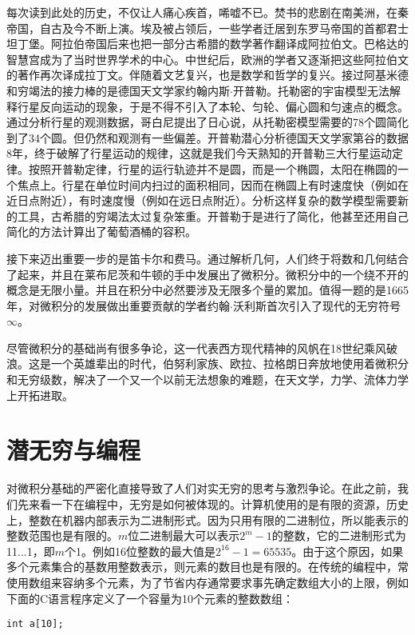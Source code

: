 \documentclass{article}
\begin{document}
每次读到此处的历史，不仅让人痛心疾首，唏嘘不已。焚书的悲剧在南美洲，在秦帝国，自古及今不断上演。埃及被占领后，一些学者迁居到东罗马帝国的首都君士坦丁堡。阿拉伯帝国后来也把一部分古希腊的数学著作翻译成阿拉伯文。巴格达的智慧宫成为了当时世界学术的中心。中世纪后，欧洲的学者又逐渐把这些阿拉伯文的著作再次译成拉丁文。伴随着文艺复兴，也是数学和哲学的复兴。接过阿基米德和穷竭法的接力棒的是德国天文学家约翰内斯$\cdot$开普勒。托勒密的宇宙模型无法解释行星反向运动的现象，于是不得不引入了本轮、匀轮、偏心圆和匀速点的概念。通过分析行星的观测数据，哥白尼提出了日心说，从托勒密模型需要的78个圆简化到了34个圆。但仍然和观测有一些偏差。开普勒潜心分析德国天文学家第谷的数据8年，终于破解了行星运动的规律，这就是我们今天熟知的开普勒三大行星运动定律。按照开普勒定律，行星的运行轨迹并不是圆，而是一个椭圆，太阳在椭圆的一个焦点上。行星在单位时间内扫过的面积相同，因而在椭圆上有时速度快（例如在近日点附近），有时速度慢（例如在远日点附近）。分析这样复杂的数学模型需要新的工具，古希腊的穷竭法太过复杂笨重。开普勒于是进行了简化，他甚至还用自己简化的方法计算出了葡萄酒桶的容积。

接下来迈出重要一步的是笛卡尔和费马。通过解析几何，人们终于将数和几何结合了起来，并且在莱布尼茨和牛顿的手中发展出了微积分。微积分中的一个绕不开的概念是无限小量。并且在积分中必然要涉及无限多个量的累加。值得一题的是1665年，对微积分的发展做出重要贡献的学者约翰$\cdot$沃利斯首次引入了现代的无穷符号$\infty$。

尽管微积分的基础尚有很多争论，这一代表西方现代精神的风帆在18世纪乘风破浪。这是一个英雄辈出的时代，伯努利家族、欧拉、拉格朗日奔放地使用着微积分和无穷级数，解决了一个又一个以前无法想象的难题，在天文学，力学、流体力学上开拓进取。

\section{潜无穷与编程}
对微积分基础的严密化直接导致了人们对实无穷的思考与激烈争论。在此之前，我们先来看一下在编程中，无穷是如何被体现的。计算机使用的是有限的资源，历史上，整数在机器内部表示为二进制形式。因为只用有限的二进制位，所以能表示的整数范围也是有限的。$m$位二进制最大可以表示$2^m-1$的整数，它的二进制形式为11...1，即$m$个1。例如16位整数的最大值是$2^{16}-1 = 65535$。由于这个原因，如果多个元素集合的基数用整数表示，则元素的数目也是有限的。在传统的编程中，常使用数组来容纳多个元素，为了节省内存通常要求事先确定数组大小的上限，例如下面的C语言程序定义了一个容量为10个元素的整数数组：

\begin{verbatim}
int a[10];
\end{verbatim}
\end{document}

